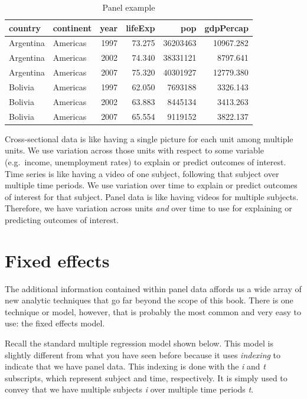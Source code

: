\documentclass[
]{book}
\begin{document}
\begin{table}

\caption{\label{tab:panelrep}Panel example}
\centering
\begin{tabular}[t]{l|l|r|r|r|r}
\hline
country & continent & year & lifeExp & pop & gdpPercap\\
\hline
Argentina & Americas & 1997 & 73.275 & 36203463 & 10967.282\\
\hline
Argentina & Americas & 2002 & 74.340 & 38331121 & 8797.641\\
\hline
Argentina & Americas & 2007 & 75.320 & 40301927 & 12779.380\\
\hline
Bolivia & Americas & 1997 & 62.050 & 7693188 & 3326.143\\
\hline
Bolivia & Americas & 2002 & 63.883 & 8445134 & 3413.263\\
\hline
Bolivia & Americas & 2007 & 65.554 & 9119152 & 3822.137\\
\hline
\end{tabular}
\end{table}

Cross-sectional data is like having a single picture for each unit among multiple units. We use variation across those units with respect to some variable (e.g.~income, unemployment rates) to explain or predict outcomes of interest. Time series is like having a video of one subject, following that subject over multiple time periods. We use variation over time to explain or predict outcomes of interest for that subject. Panel data is like having videos for multiple subjects. Therefore, we have variation across units \emph{and} over time to use for explaining or predicting outcomes of interest.

\hypertarget{fixed-effects}{%
\section{Fixed effects}\label{fixed-effects}}

The additional information contained within panel data affords us a wide array of new analytic techniques that go far beyond the scope of this book. There is one technique or model, however, that is probably the most common and very easy to use: the fixed effects model.

Recall the standard multiple regression model shown below. This model is slightly different from what you have seen before because it uses \emph{indexing} to indicate that we have panel data. This indexing is done with the \emph{i} and \emph{t} subscripts, which represent subject and time, respectively. It is simply used to convey that we have multiple subjects \emph{i} over multiple time periods \emph{t}.
\end{document}
